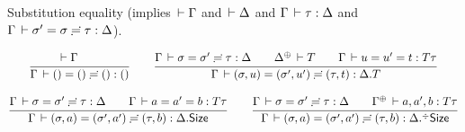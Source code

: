 \documentclass[acmlarge,review,anonymous]{acmart}\settopmatter{printfolios=true}
\begin{document}




Substitution equality
(implies $\,\vdash \Gamma$ and $\,\vdash \Delta$ and $\Gamma \,\vdash \tau : \Delta$ and $\Gamma \,\vdash \sigma' = \sigma \risingdotseq \tau : \Delta$).


\begin{gather*}
  \ru{\der \Gamma \qquad
    }{\sueq \Gamma \sempty \sempty \sempty \cempty}
\qquad
  \ru{\sueq \Gamma \sigma {\sigma'} \tau \Delta \qquad
      \resurrect \Delta \der T \qquad
      \Gamma \der u = u' = t : T \tau
    }{\sueq \Gamma {\sext \sigma u } {\sext {\sigma'} {u'}} {\sext \tau t} {\cext \Delta T}}
\\[2ex]
  \ru{\sueq \Gamma \sigma {\sigma'} \tau \Delta \qquad
      \Gamma \der a = a' = b : T \tau
    }{\sueq \Gamma {\sext \sigma a } {\sext {\sigma'} {a'}} {\sext \tau b} {\cext \Delta \Size}}
\qquad
  \ru{\sueq \Gamma \sigma {\sigma'} \tau \Delta \qquad
      \resurrect\Gamma \der a, a', b : T \tau
    }{\sueq \Gamma {\sext \sigma a } {\sext {\sigma'} {a'}} {\sext \tau b} {\erext \Delta \Size}}
\end{gather*}
\end{document}
